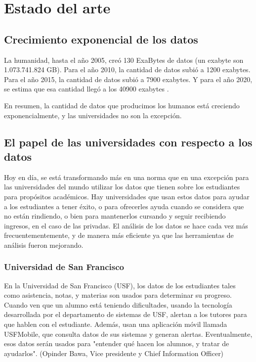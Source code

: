 \chapter{Estado del arte}
\label{sec:hello}

\section[Crecimiento exponencial de los datos]{Crecimiento exponencial de los datos} 


La humanidad, hasta el año 2005, creó 130 ExaBytes de datos (un exabyte son 1.073.741.824 GB). Para el año 2010, la cantidad de datos subió a 1200 exabytes. Para el año 2015, la cantidad de datos subió a 7900 exabytes. Y para el año 2020, se estima que esa cantidad llegó a los 40900 exabytes \cite{IDC}.

En resumen, la cantidad de datos que producimos los humanos está creciendo exponencialmente, y las universidades no son la excepción.



\section[El papel de las universidades con respecto a los datos]{El papel de las universidades con respecto a los datos}

Hoy en día, se está transformando más en una norma que en una excepción para las universidades del mundo utilizar los datos que tienen sobre los estudiantes para propósitos académicos. Hay universidades que usan estos datos para ayudar a los estudiantes a tener éxito, o para ofrecerles ayuda cuando se considera que no están rindiendo, o bien para mantenerlos cursando y seguir recibiendo ingresos, en el caso de las privadas.
El análisis de los datos se hace cada vez más frecuentementemente, y de manera más eficiente ya que las herramientas de análisis fueron mejorando.

\subsection[Universidad de San Francisco]{Universidad de San Francisco}

En la Universidad de San Francisco (USF), los datos de los estudiantes tales como asistencia, notas, y materias son usados para determinar su progreso. Cuando ven que un alumno está teniendo dificultades, usando la tecnología desarrollada por el departamento de sistemas de USF, alertan a los tutores para que hablen con el estudiante.
Además, usan una aplicación móvil llamada USFMobile, que consulta datos de sus sistemas y generan alertas.
Eventualmente, esos datos serán usados para "entender qué hacen los alumnos, y tratar de ayudarlos". (Opinder Bawa, Vice presidente y Chief Information Officer)

